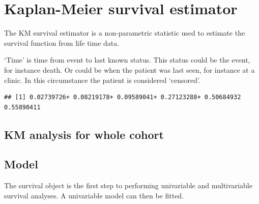 \documentclass[]{book}
\makeatletter
\newenvironment{Shaded}{\begin{snugshade}}{\end{snugshade}}
\newcommand{\KeywordTok}[1]{\textcolor[rgb]{0.13,0.29,0.53}{\textbf{#1}}}
\newcommand{\DecValTok}[1]{\textcolor[rgb]{0.00,0.00,0.81}{#1}}
\newcommand{\StringTok}[1]{\textcolor[rgb]{0.31,0.60,0.02}{#1}}
\newcommand{\CommentTok}[1]{\textcolor[rgb]{0.56,0.35,0.01}{\textit{#1}}}
\newcommand{\OperatorTok}[1]{\textcolor[rgb]{0.81,0.36,0.00}{\textbf{#1}}}
\newcommand{\NormalTok}[1]{#1}
\newenvironment{kframe}{%
\medskip{}
\setlength{\fboxsep}{.8em}
 \def\at@end@of@kframe{}%
 \ifinner\ifhmode%
  \def\at@end@of@kframe{\end{minipage}}%
  \begin{minipage}{\columnwidth}%
 \fi\fi%
 \def\FrameCommand##1{\hskip\@totalleftmargin \hskip-\fboxsep
 \colorbox{shadecolor}{##1}\hskip-\fboxsep
     \hskip-\linewidth \hskip-\@totalleftmargin \hskip\columnwidth}%
 \MakeFramed {\advance\hsize-\width
   \@totalleftmargin\z@ \linewidth\hsize
   \@setminipage}}%
 {\par\unskip\endMakeFramed%
 \at@end@of@kframe}
\renewenvironment{Shaded}{\begin{kframe}}{\end{kframe}}
\makeatother
\begin{document}
\section{Kaplan-Meier survival
estimator}\label{kaplan-meier-survival-estimator}

The KM survival estimator is a non-parametric statistic used to estimate
the survival function from life time data.

`Time' is time from event to last known status. This status could be the
event, for instance death. Or could be when the patient was last seen,
for instance at a clinic. In this circumstance the patient is considered
`censored'.

\begin{Shaded}
\end{Shaded}

\begin{verbatim}
## [1] 0.02739726+ 0.08219178+ 0.09589041+ 0.27123288+ 0.50684932  0.55890411
\end{verbatim}

\subsection{KM analysis for whole
cohort}\label{km-analysis-for-whole-cohort}

\subsection{Model}\label{model}

The survival object is the first step to performing univariable and
multivariable survival analyses. A univariable model can then be fitted.
\end{document}
